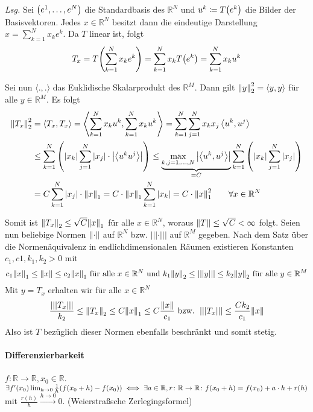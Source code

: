 \documentclass{scrreprt}
\newcommand\skalprod[1]{\left\langle #1 \right\rangle}
\newcommand\nnorm[1]{\left\lvert\left\lvert\left\lvert #1 \right\rvert\right\rvert\right\rvert}
\begin{document}
\textit{Lsg.} Sei $\qty(e^1, \ldots, e^N)$ die Standardbasis des $\mathbb{R}^N$
und $u^k \coloneqq T\qty(e^k)$ die Bilder der Basisvektoren.
Jedes $x \in \mathbb{R}^N$ besitzt dann die eindeutige Darstellung
$x = \sum_{k = 1}^N x_k e^k$.
Da $T$ linear ist, folgt
\[
  T_x = T\qty(\sum_{k = 1}^N x_k e^k) = \sum_{k = 1}^N x_k T\qty(e^k) = \sum_{k = 1}^N x_k u^k
\]

Sei nun $\langle ., . \rangle$ das Euklidische Skalarprodukt des $\mathbb{R}^M$.
Dann gilt $\norm{y}_2^2 = \langle y, y \rangle$ für alle $y \in \mathbb{R}^M$.
Es folgt
\begin{align*}
  \norm{T_x}_2^2 &= \skalprod{T_x, T_x} = \skalprod{\sum_{k=1}^N x_ku^k, \sum_{k=1}^N x_ku^k}
                   = \sum_{k=1}^N \sum_{j=1}^N x_k x_j \skalprod{u^k, u^j} \\
                 &\leq \sum_{k=1}^N \qty(\abs{x_k} \sum_{j=1}^N \abs{x_j} \cdot \abs{\skalprod{u^ku^j}})
                   \leq \underset{= C}{\underbrace{\max_{k,j = 1, \ldots, N} \abs{\skalprod{u^k, u^j}}}}
                   \sum_{k=1}^N \qty(\abs{x_k} \sum_{j=1}^N \abs{x_j}) \\
                 &= C \sum_{k=1}^N \abs{x_j} \cdot \norm{x}_1 = C \cdot \norm{x}_1 \sum_{k=1}^N \abs{x_k}
                   = C \cdot \norm{x}_1^2 \qquad \forall x \in \mathbb{R}^N
\end{align*}

Somit ist $\norm{T_x}_2 \leq \sqrt{C} \norm{x}_1$ für alle $x \in \mathbb{R}^N$,
woraus $\norm{T} \leq \sqrt{C} < \infty$ folgt.
Seien nun beliebige Normen $\norm{\cdot}$ auf $\mathbb{R}^N$ bzw.
$\nnorm{\cdot}$ auf $\mathbb{R}^M$ gegeben.
Nach dem Satz über die Normenäquivalenz in endlichdimensionalen Räumen
existieren Konstanten $c_1, c1, k_1, k_2 > 0$ mit
\[
  c_1\norm{x}_1 \leq \norm{x} \leq c_2 \norm{x}_1 \text{ für alle }
  x \in \mathbb{R}^N \text{ und }
  k_1\norm{y}_2 \leq \nnorm{y} \leq k_2 \norm{y}_2
  \text{ für alle } y \in \mathbb{R}^M
\]
Mit $y = T_x$ erhalten wir für alle $x \in \mathbb{R}^N$
\[
  \frac{\nnorm{T_x}}{k_2} \leq \norm{T_x}_2 \leq C \norm{x}_1 \leq C \frac{\norm{x}}{c_1}
  \text{ bzw. } \nnorm{T_x} \leq \frac{Ck_2}{c_1}\norm{x}
\]
Also ist $T$ bezüglich dieser Normen ebenfalls beschränkt und somit stetig.

\paragraph{Differenzierbarkeit} $f \colon \mathbb{R} \to \mathbb{R}, x_0 \in \mathbb{R}$. \\
$\exists f'(x_0) \lim_{h \to 0} \frac{1}{h} \qty(f(x_0 + h) - f(x_0))
\iff \exists a \in \mathbb{R}, r \colon \mathbb{R} \to \mathbb{R} \colon
f(x_0 + h) = f(x_0) + a \cdot h + r(h)$
mit $\frac{r(h)}{h} \overset{h \to 0} \longrightarrow 0$. (Weierstraßsche Zerlegingsformel)
\end{document}
